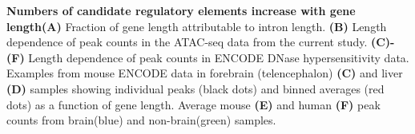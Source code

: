 \textbf{Numbers of candidate regulatory elements increase with gene length}\textbf{(A)} Fraction of gene length attributable to intron
length. \textbf{(B)} Length dependence of peak counts in the ATAC-seq data from the current study. \textbf{(C)-(F)} Length dependence of peak counts in ENCODE DNase hypersensitivity data. Examples from mouse ENCODE data in forebrain (telencephalon) \textbf{(C)} and liver \textbf{(D)} samples showing individual peaks (black dots) and binned averages (red dots) as a function of gene length. Average mouse \textbf{(E)} and human \textbf{(F)} peak counts from brain(blue) and non-brain(green) samples.

